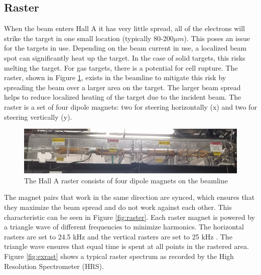 \subsection{Raster}

When the beam enters Hall A it has very little spread, all of the electrons will strike the target in one small location (typically 80-200$\mu m$). This poses an issue for the targets in use. Depending on the beam current in use, a localized beam spot can significantly heat up the target. In the case of solid targets, this risks melting the target. For gas targets, there is a potential for cell rupture. The raster, shown in Figure \ref{fig:rasterpic}, exists in the beamline to mitigate this risk by spreading the beam over a larger area on the target. The larger beam spread helps to reduce localized heating of the target due to the incident beam. The raster is a set of four dipole magnets: two for steering horizontally (x) and two for steering vertically (y).\cite{Bob}

\begin{figure}[h]
\begin{center}
	\includegraphics[width=\textwidth]{./setup/fig/raster_pic.jpg}
	\caption{The Hall A raster consists of four dipole magnets on the beamline}
	\label{fig:rasterpic}
\end{center}
\end{figure}

The magnet pairs that work in the same direction are synced, which ensures that they maximize the beam spread and do not work against each other. This characteristic can be seen in Figure \ref{fig:raster}. Each raster magnet is powered by a triangle wave of different frequencies to minimize harmonics. The horizontal rasters are set to 24.5 kHz and the vertical rasters are set to 25 kHz \cite{rast_current}. The triangle wave ensures that equal time is spent at all points in the rastered area. Figure \ref{fig:exrast} shows a typical raster spectrum as recorded by the High Resolution Spectrometer (HRS).

